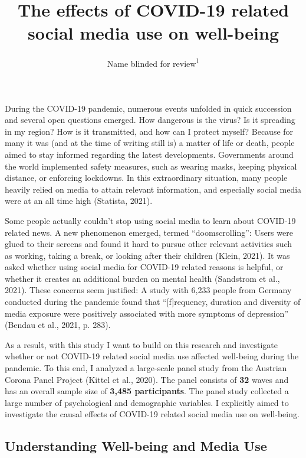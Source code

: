 \documentclass[
  man,mask]{apa7}
\title{The effects of COVID-19 related social media use on well-being}
\author{Name blinded for review\textsuperscript{1}}
\date{}
\affiliation{\vspace{0.5cm}\textsuperscript{1} }
\begin{document}
\maketitle

During the COVID-19 pandemic,
numerous events unfolded in quick succession and several open questions emerged.
How dangerous is the virus?
Is it spreading in my region?
How is it transmitted, and how can I protect myself?
Because for many it was (and at the time of writing still is) a matter of life or death, people aimed to stay informed regarding the latest developments.
Governments around the world implemented safety measures, such as wearing masks, keeping physical distance, or enforcing lockdowns.
In this extraordinary situation, many people heavily relied on media to attain relevant information, and especially social media were at an all time high (Statista, 2021).

Some people actually couldn't stop using social media to learn about COVID-19 related news.
A new phenomenon emerged, termed ``doomscrolling'':
Users were glued to their screens and found it hard to pursue other relevant activities such as working, taking a break, or looking after their children (Klein, 2021).
It was asked whether using social media for COVID-19 related reasons is helpful, or whether it creates an additional burden on mental health (Sandstrom et al., 2021).
These concerns seem justified:
A study with 6,233 people from Germany conducted during the pandemic found that ``{[}f{]}requency, duration and diversity of media exposure were positively associated with more symptoms of depression'' (Bendau et al., 2021, p. 283).

As a result, with this study I want to build on this research and investigate whether or not COVID-19 related social media use affected well-being during the pandemic.
To this end, I analyzed a large-scale panel study from the Austrian Corona Panel Project (Kittel et al., 2020).
The panel consists of \textbf{32} waves and has an overall sample size of \textbf{3,485 participants}.
The panel study collected a large number of psychological and demographic variables.
I explicitly aimed to investigate the causal effects of COVID-19 related social media use on well-being.

\hypertarget{understanding-well-being-and-media-use}{%
\subsection{Understanding Well-being and Media Use}\label{understanding-well-being-and-media-use}}
\end{document}
